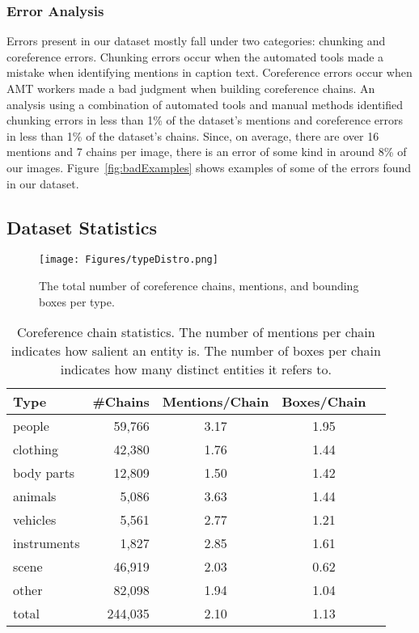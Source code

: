 \documentclass[twocolumn]{svjour3}
\begin{document}
\subsubsection{Error Analysis}

Errors present in our dataset mostly fall under two categories: chunking and coreference errors.  Chunking errors occur when the automated tools made a mistake when identifying mentions in caption text.  Coreference errors occur when AMT workers made a bad judgment when building coreference chains.  An analysis using a combination of automated tools and manual methods identified chunking errors in less than 1\% of the dataset's mentions and coreference errors in less than 1\% of the dataset’s chains. Since, on average, there are over 16 mentions and 7 chains per image, there is an error of some kind in around 8\% of our images. Figure~\ref{fig:badExamples} shows examples of some of the errors found in our dataset.

\subsection{Dataset Statistics} \label{sec:statistics}

\begin{figure}
\texttt{[image: Figures/typeDistro.png]}\vspace{-7pt}
\caption{The total number of coreference chains, mentions, and bounding boxes per type.}
\label{fig:Stats}
\end{figure}

\begin{table}
	\caption{Coreference chain statistics. The number of mentions per chain indicates how salient an entity is. The number of boxes per chain indicates how many distinct entities it refers to.}
    \label{table:entity_by_type}
\small
	\begin{tabular}{|l|r|c|c|c}
    	\hline
		Type & \#Chains & Mentions/Chain  &
        Boxes/Chain\\
		\hline
		people & 59,766 & 3.17 &	1.95\\
		clothing & 42,380 & 1.76 & 1.44\\
		body parts & 12,809 & 1.50 & 1.42\\
		animals	& 5,086 & 3.63 & 1.44\\
		vehicles & 5,561 & 2.77 & 1.21\\
instruments	& 1,827 & 2.85 & 1.61\\
        scene & 46,919 & 2.03 & 0.62\\
		other & 82,098 & 1.94 & 1.04\\
        total & 244,035 & 2.10 & 1.13\\\hline
    \end{tabular}
\end{table}
\end{document}
